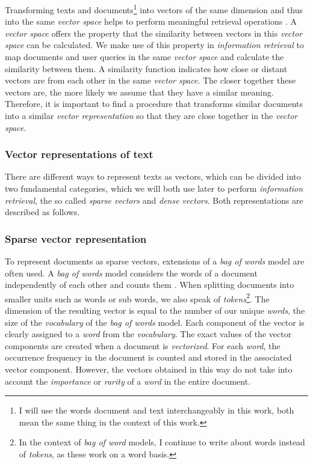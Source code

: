 \documentclass{article}
\begin{document}
Transforming texts and documents\footnote{I will use the words document and text interchangeably in this work, both mean the same thing in the context of this work.} into vectors of the same dimension and thus into the same \textit{vector space} helps to perform meaningful retrieval operations \cite{vectorSpaceModel}. A \textit{vector space} offers the property that the similarity between vectors in this \textit{vector space} can be calculated. We make use of this property in \textit{information retrieval} to map documents and user queries in the same \textit{vector space} and calculate the similarity between them. A similarity function indicates how close or distant vectors are from each other in the same \textit{vector space}. The closer together these vectors are, the more likely we assume that they have a similar meaning. Therefore, it is important to find a procedure that transforms similar documents into a similar \textit{vector representation} so that they are close together in the \textit{vector space}.

\subsubsection{Vector representations of text}
There are different ways to represent texts as vectors, which can be divided into two fundamental categories, which we will both use later to perform \textit{information retrieval}, the so called \textit{sparse vectors} and \textit{dense vectors}. Both representations are described as follows.

\subsubsection*{Sparse vector representation} 
To represent documents as sparse vectors, extensions of a \textit{bag of words} model are often used. A \textit{bag of words} model considers the words of a document independently of each other and counts them \cite[pp.~13ff]{eisensteinNLP}. When splitting documents into smaller units such as words or sub words, we also speak of \textit{tokens}\footnote{In the context of \textit{bag of word} models, I continue to write about words instead of \textit{tokens}, as these work on a word basis.}. The dimension of the resulting vector is equal to the number of our unique \textit{words}, the size of the \textit{vocabulary} of the \textit{bag of words} model. Each component of the vector is clearly assigned to a \textit{word} from the \textit{vocabulary}. The exact values of the vector components are created when a document is \textit{vectorized}. For each \textit{word}, the occurrence frequency in the document is counted and stored in the associated vector component. However, the vectors obtained in this way do not take into account the \textit{importance} or \textit{rarity} of a \textit{word} in the entire document.
\end{document}
